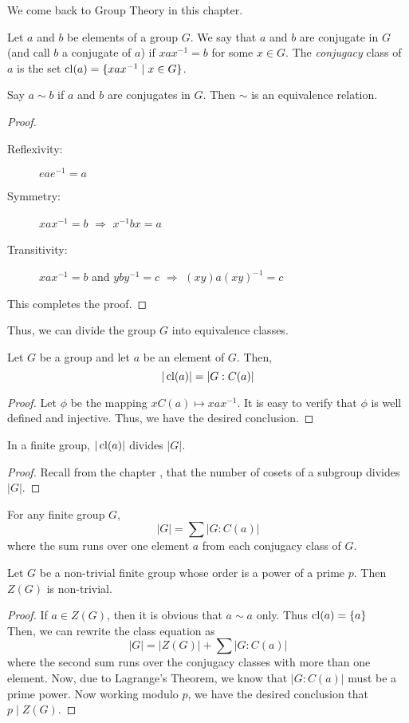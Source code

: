 We come back to Group Theory in this chapter.
\begin{definition}
	Let $a$ and $b$ be elements of a group $G$. We say that $a$ and $b$ are conjugate in $G$ (and call $b$ a conjugate of $a$) if $xax^{-1}=b$ for some $x\in G$. The \textit{conjugacy} class of $a$ is the set $\operatorname{cl}(a) = \{xax^{-1}\mid x\in G\}$.
\end{definition}

\begin{lemma}
	Say $a\sim b$ if $a$ and $b$ are conjugates in $G$. Then $\sim$ is an equivalence relation.
\end{lemma}
\begin{proof}
	\hfill
	\begin{description}
		\item[Reflexivity:] $eae^{-1} = a$
		\item[Symmetry:] $xax^{-1}=b$ $\Longrightarrow$ $x^{-1}bx = a$
		\item[Transitivity:] $xax^{-1}=b$ and $yby^{-1}=c$ $\Longrightarrow$ $(xy)a(xy)^{-1}=c$
	\end{description}
	This completes the proof.
\end{proof}

Thus, we can divide the group $G$ into equivalence classes.

\begin{proposition}
	Let $G$ be a group and let $a$ be an element of $G$. Then, 
	$$|\operatorname{cl}(a)|=|G:C(a)|$$
\end{proposition}
\begin{proof}
	Let $\phi$ be the mapping $xC(a)\mapsto xax^{-1}$. It is easy to verify that $\phi$ is well defined and injective. Thus, we have the desired conclusion.
\end{proof}

\begin{corollary}
	In a finite group, $|\operatorname{cl}(a)|$ divides $|G|$.
\end{corollary}
\begin{proof}
	Recall from the chapter , that the number of cosets of a subgroup divides $|G|$.  
\end{proof}

\begin{definition}
	For any finite group $G$,
	$$|G| = \sum|G:C(a)|$$
	where the sum runs over one element $a$ from each conjugacy class of $G$.
\end{definition}

\begin{proposition}
	Let $G$ be a non-trivial finite group whose order is a power of a prime $p$. Then $Z(G)$ is non-trivial.
\end{proposition}
\begin{proof}
	If $a\in Z(G)$, then it is obvious that $a\sim a$ only. Thus $\operatorname{cl}(a)=\{a\}$\\
	Then, we can rewrite the class equation as 
	$$
	|G| = |Z(G)| + \sum|G:C(a)|
	$$
	where the second sum runs over the conjugacy classes with more than one element. Now, due to Lagrange's Theorem, we know that $|G:C(a)|$ must be a prime power. Now working modulo $p$, we have the desired conclusion that $p\mid Z(G)$.
\end{proof}

